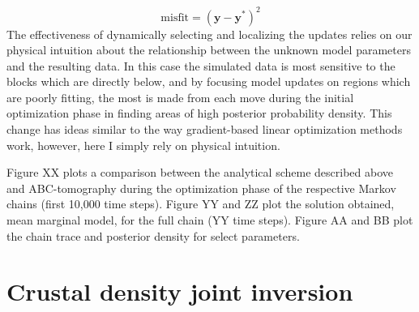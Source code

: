 \begin{equation}
	\text{misfit} = (\bm{y}-\bm{y^*})^2
\end{equation}
The effectiveness of dynamically selecting and localizing the updates relies on our physical intuition about the relationship between the unknown model parameters and the resulting data. In this case the simulated data is most sensitive to the blocks which are directly below, and by focusing model updates on regions which are poorly fitting, the most is made from each move during the initial optimization phase in finding areas of high posterior probability density. This change has ideas similar to the way gradient-based linear optimization methods work, however, here I simply rely on physical intuition. \par
Figure XX plots a comparison between the analytical scheme described above and ABC-tomography during the optimization phase of the respective Markov chains (first 10,000 time steps). Figure YY and ZZ plot the solution obtained, mean marginal model, for the full chain (YY time steps). Figure AA and BB plot the chain trace and posterior density for select parameters. 





\section{Crustal density joint inversion}